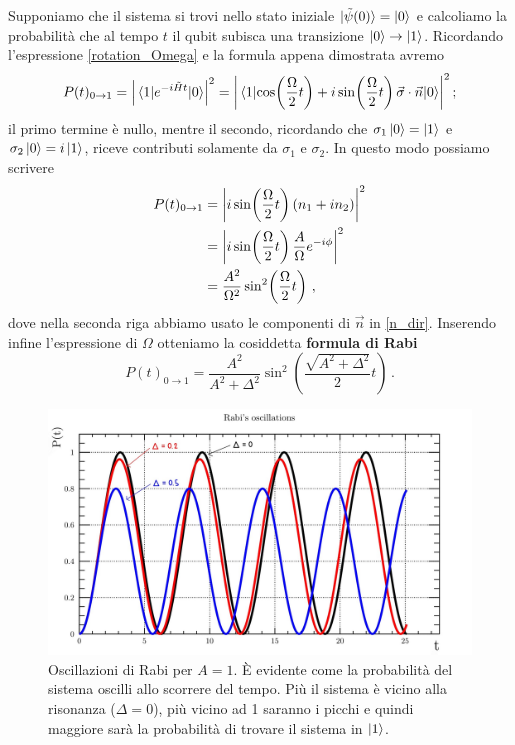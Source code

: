 \begin{esempio}
    Supponiamo che il sistema si trovi nello stato iniziale $| \tilde{\psi}(0) \rangle = \ket{0}$ e calcoliamo la probabilità che al tempo $t$ il qubit subisca una transizione $\ket{0} \to \ket{1}$. Ricordando l'espressione \eqref{rotation_Omega} e la formula appena dimostrata avremo
    \begin{equation*}
        P(t)_{0 \to 1} = \abs{\mel{1}{e^{-i \tilde{H} t}}{0}}^2 = \abs{\mel{1}{\cos \! \left( \frac{\Omega}{2} t \right) + i \sin \! \left( \frac{\Omega}{2} t \right) \vec \sigma \cdot \vec n }{0}}^2 \, ;
    \end{equation*}
    il primo termine è nullo, mentre il secondo, ricordando che $\sigma_1 \ket{0} = \ket{1}$ e $\sigma_2 \ket{0} = i \ket{1}$, riceve contributi solamente da $\sigma_1$ e $\sigma_2$. In questo modo possiamo scrivere 
    \begin{align*}
        P(t)_{0 \to 1} &= \abs{i \sin \! \left( \frac{\Omega}{2} t \right) (n_1 + i n_2)}^2 \\
        &= \abs{i \sin \! \left( \frac{\Omega}{2} t \right) \frac{A}{\Omega} e^{-i \phi}}^2 \\
        &= \frac{A^2}{\Omega^2} \sin^2 \! \left( \frac{\Omega}{2} t \right) \, ,
    \end{align*}
    dove nella seconda riga abbiamo usato le componenti di $\vec n$ in \eqref{n_dir}. Inserendo infine l'espressione di $\Omega$ otteniamo la cosiddetta \textbf{formula di Rabi}
    \begin{equation}\label{Rabi_formula}
        P(t)_{0 \to 1} = \frac{A^2}{A^2+\Delta^2} \sin^2 \! \left( \frac{\sqrt{A^2+\Delta^2}}{2} t \right) \, .
    \end{equation}
    
    \begin{figure}[!hb]
    \centering
    \includegraphics[scale=0.302]{images/Rabi.jpg}
    \caption{Oscillazioni di Rabi per $A = 1$. È evidente come la probabilità del sistema oscilli allo scorrere del tempo. Più il sistema è vicino alla risonanza ($\Delta = 0$), più vicino ad 1 saranno i picchi e quindi maggiore sarà la probabilità di trovare il sistema in $\ket{1}$.}
    \label{fig:Rabi}
    \end{figure}
    

\end{esempio}
